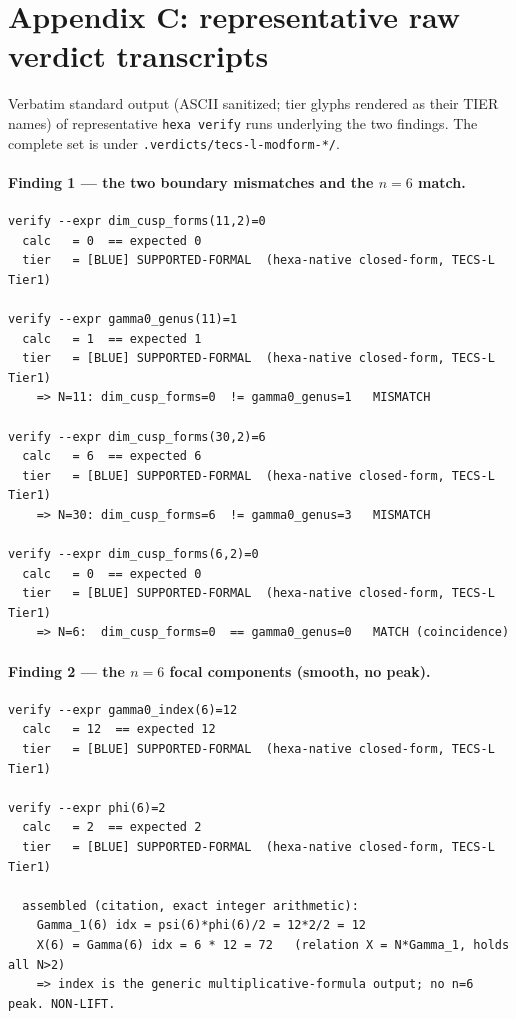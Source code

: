 \documentclass[11pt,a4paper]{article}
\theoremstyle{definition}
\begin{document}
\section{Appendix C: representative raw verdict transcripts}
\label{app:transcripts}

Verbatim standard output (ASCII sanitized; tier glyphs rendered as their
\textsc{TIER} names) of representative \texttt{hexa verify} runs underlying the
two findings. The complete set is under \texttt{.verdicts/tecs-l-modform-*/}.

\paragraph{Finding 1 --- the two boundary mismatches and the $n=6$ match.}
\begin{verbatim}
verify --expr dim_cusp_forms(11,2)=0
  calc   = 0  == expected 0
  tier   = [BLUE] SUPPORTED-FORMAL  (hexa-native closed-form, TECS-L Tier1)

verify --expr gamma0_genus(11)=1
  calc   = 1  == expected 1
  tier   = [BLUE] SUPPORTED-FORMAL  (hexa-native closed-form, TECS-L Tier1)
    => N=11: dim_cusp_forms=0  != gamma0_genus=1   MISMATCH

verify --expr dim_cusp_forms(30,2)=6
  calc   = 6  == expected 6
  tier   = [BLUE] SUPPORTED-FORMAL  (hexa-native closed-form, TECS-L Tier1)
    => N=30: dim_cusp_forms=6  != gamma0_genus=3   MISMATCH

verify --expr dim_cusp_forms(6,2)=0
  calc   = 0  == expected 0
  tier   = [BLUE] SUPPORTED-FORMAL  (hexa-native closed-form, TECS-L Tier1)
    => N=6:  dim_cusp_forms=0  == gamma0_genus=0   MATCH (coincidence)
\end{verbatim}

\paragraph{Finding 2 --- the $n=6$ focal components (smooth, no peak).}
\begin{verbatim}
verify --expr gamma0_index(6)=12
  calc   = 12  == expected 12
  tier   = [BLUE] SUPPORTED-FORMAL  (hexa-native closed-form, TECS-L Tier1)

verify --expr phi(6)=2
  calc   = 2  == expected 2
  tier   = [BLUE] SUPPORTED-FORMAL  (hexa-native closed-form, TECS-L Tier1)

  assembled (citation, exact integer arithmetic):
    Gamma_1(6) idx = psi(6)*phi(6)/2 = 12*2/2 = 12
    X(6) = Gamma(6) idx = 6 * 12 = 72   (relation X = N*Gamma_1, holds all N>2)
    => index is the generic multiplicative-formula output; no n=6 peak. NON-LIFT.
\end{verbatim}
\end{document}
